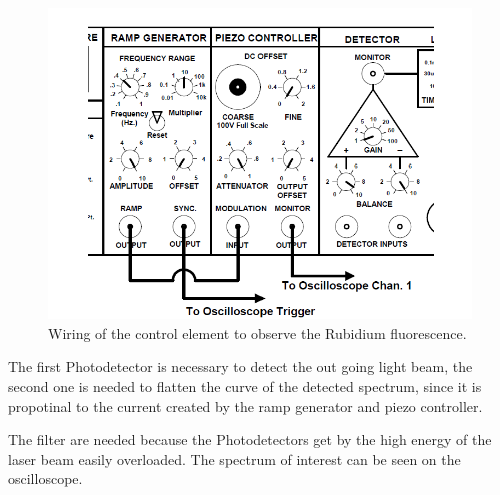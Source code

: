 \begin{figure}[H]
	\centering
	\includegraphics[width=\textwidth]{setup1.png}
	\caption{Wiring of the control element to observe the Rubidium fluorescence. \cite{V60}}
	\label{fig:set1}
\end{figure}

\noindent
The first Photodetector is necessary to detect the out going light beam, the second one is needed to flatten
the curve of the detected spectrum, since it is propotinal to the current created by the ramp generator and
piezo controller. 

\noindent
The filter are needed because the Photodetectors get by the high energy of the laser beam easily overloaded.
The spectrum of interest can be seen on the oscilloscope.




